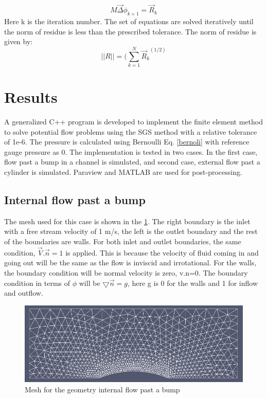 \documentclass[12pt]{elsarticle}
\begin{document}
	\begin{equation}
		M {\overrightarrow \Delta \phi }_{k+1} = {\overrightarrow R}_{k} 
	\end{equation}\newline
	Here k is the iteration number.  The set of equations are solved iteratively until the norm of residue is less than the prescribed tolerance. The norm of residue is given by:
	\begin{equation}
		||R|| = (\sum\limits_{k=1}^N {{\overrightarrow R}_{k}}^(1/2)
	\end{equation}\newline
	\section{Results}
	A generalized C++ program is developed to implement the finite element method to solve potential flow problems using the SGS method with a relative tolerance of 1e-6. The pressure is calculated using Bernoulli Eq. \ref{bernoli} with reference gauge pressure as 0. The implementation is tested in two cases. In the first case, flow past a bump in a channel is simulated, and second case, external flow past a cylinder is simulated. Paraview and MATLAB are used for post-processing. 
	
	\subsection{Internal flow past a bump}
	
	The mesh used for this case is shown in the \ref{bum_mesh}. The right boundary is the inlet with a free stream velocity of 1 m/s, the left is the outlet boundary and the rest of the boundaries are walls. For both inlet and outlet boundaries, the same condition, $\overrightarrow{V}.\overrightarrow{n}=1$ is applied. This is because the velocity of fluid coming in and going out will be the same as the flow is inviscid and irrotational. For the walls, the boundary condition will be normal velocity is zero, v.n=0. The boundary condition in terms of $\phi$ will be $\bigtriangledown \overrightarrow{n} = g$, here g is 0 for the walls and 1 for inflow and outflow.\newline
	
	\begin{figure}[h]\label{bum_mesh}
		\centering\includegraphics[width=1.0\linewidth]{bum_mesh_png}
		\caption{Mesh for the geometry internal flow past a bump}
	\end{figure}
	
\end{document}
